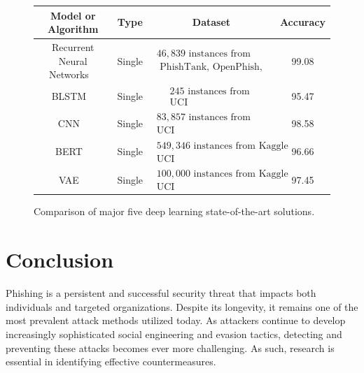 \documentclass[final]{cvpr}
\begin{document}
\begin{figure}
   \begin{center}
      \begin{tabular}{cccc}
         \hline
         Model or Algorithm & Type & Dataset & Accuracy \\
         \hline
         Recurrent Neural Networks ~\cite{rangapur2021phish} & Single & $\begin{array}{c}46,839 \text { instances from } \\ \text { PhishTank, OpenPhish, and Common
Crawl }\end{array}$  & 99.08\\
         \hline
         BLSTM ~\cite{wang2021deep} & Single & $\begin{array}{c}245 \text { instances from } \\ \text {UCI}\end{array}$  & 95.47\\
        \hline
        CNN ~\cite{aljofey2021effective} & Single & $\begin{array}{c}83,857 \text { instances from PhishTank} \\ \text {UCI}\end{array}$  & 98.58\\
        \hline
        BERT ~\cite{elsadig2021intelligent} & Single & $\begin{array}{c}549,346 \text { instances from Kaggle} \\ \text {UCI}\end{array}$  & 96.66\\
        \hline
        VAE ~\cite{prabakaran2021enhanced} & Single & $\begin{array}{c}100,000 \text { instances from Kaggle ISCX‐URL‐2016} \\ \text {UCI}\end{array}$  & 97.45\\
        \hline

         \end{tabular}
   \end{center}
      \caption{Comparison of major five deep learning state-of-the-art solutions.}
   \label{tab:ml-state-of-the-art}
   \end{figure}

\section{Conclusion}
\label{sec:Conclusion}
Phishing is a persistent and successful security threat that impacts both individuals and targeted organizations. Despite its longevity, it remains one of the most prevalent attack methods utilized today. As attackers continue to develop increasingly sophisticated social engineering and evasion tactics, detecting and preventing these attacks becomes ever more challenging. As such, research is essential in identifying effective countermeasures.
\end{document}
